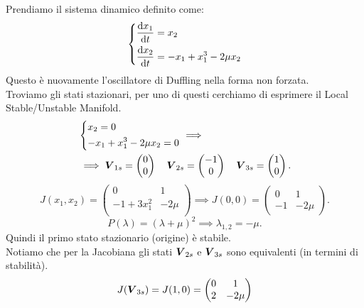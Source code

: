 \begin{exmp}
    Prendiamo il sistema dinamico definito come:
    \[
    \begin{dcases}
    \frac{\text{d} x_1}{\text{d} t} = x_2\\
    \frac{\text{d} x_2}{\text{d} t} = - x_1 + x_1^3 - 2\mu x_2
    \end{dcases}
    \]
    Questo è nuovamente l'oscillatore di Duffling nella forma non forzata.\\
    Troviamo gli stati stazionari, per uno di questi cerchiamo di esprimere il Local Stable/Unstable Manifold.
    \[\begin{aligned}
    &\begin{dcases}
    x_2=0\\
    -x_1 + x_1^3 - 2 \mu  x_2 = 0
    \end{dcases}
    \implies \\
    &\implies\boldsymbol{V}_{1s} = \begin{pmatrix} 0 \\ 0 \end{pmatrix} \quad \boldsymbol{V}_{2s} = \begin{pmatrix} -1 \\ 0 \end{pmatrix} \quad
    \boldsymbol{V}_{3s} = \begin{pmatrix} 1 \\ 0 \end{pmatrix}
    .\end{aligned}\]
    \[
	J(x_1,x_2) = 
        \begin{pmatrix}
	    0 & 1 \\
	    -1+3x_1^2 & -2\mu \\
        \end{pmatrix}
	\implies 
	J(0, 0) = 
    \begin{pmatrix}
	0 & 1 \\
	-1 & -2\mu 
    \end{pmatrix}
    .\] 
    \[
    P(\lambda) = (\lambda  + \mu)^2 \implies  \lambda_{1,2} = - \mu
    .\] 
    Quindi il primo stato stazionario (origine) è stabile.\\
    Notiamo che per la Jacobiana gli stati $\boldsymbol{V}_{2s}$ e $\boldsymbol{V}_{3s}$ sono equivalenti (in termini di stabilità).
    \[
	J(\boldsymbol{V}_{3s}) = J(1, 0) = 
    \begin{pmatrix}
	0 & 1 \\
	2 & -2\mu \\
    \end{pmatrix}
\]
\end{exmp}
